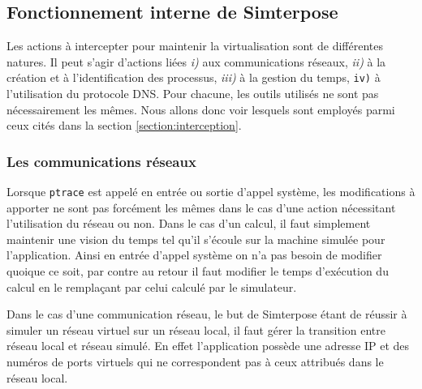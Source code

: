 \subsection{Fonctionnement interne de Simterpose}
Les actions à intercepter pour maintenir la virtualisation sont de différentes
natures. Il peut s'agir d'actions liées \textit{i)} aux communications réseaux,
\textit{ii)} à la création et à l'identification des processus, \textit{iii)} à
la gestion du temps, \texttt{iv)} à l'utilisation du protocole DNS. Pour chacune, les outils utilisés ne sont pas nécessairement les mêmes. Nous allons donc voir
lesquels sont employés parmi ceux cités dans la section
\ref{section:interception}.

\subsubsection{Les communications réseaux}

Lorsque \texttt{ptrace} est appelé en entrée ou sortie d'appel système, les
modifications à apporter ne sont pas forcément les mêmes dans le cas d'une
action nécessitant l'utilisation du réseau ou non. Dans le cas d'un calcul, il
faut simplement maintenir une vision du temps tel qu'il s'écoule sur la machine
simulée pour l'application. Ainsi en entrée d'appel système on n'a pas besoin de
modifier quoique ce soit, par contre au retour il faut modifier le temps
d'exécution du calcul en le remplaçant par celui calculé par le simulateur.

Dans le cas d'une communication réseau, le but de Simterpose étant de réussir à
simuler un réseau virtuel sur un réseau local, il faut gérer la
transition entre réseau local et réseau simulé. En effet l'application possède
une adresse IP et des numéros de ports virtuels qui ne correspondent pas à ceux attribués dans le réseau local.

